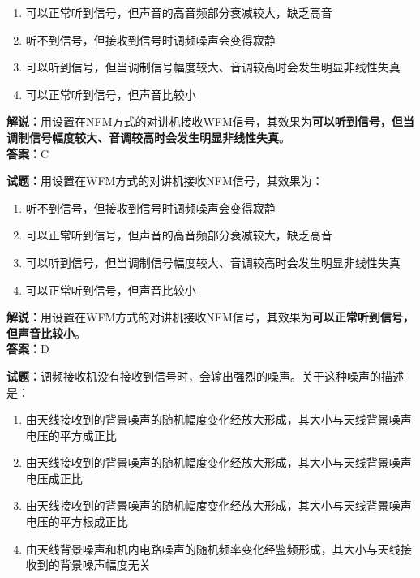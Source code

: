 \documentclass{ctexbook}
\begin{document}
\begin{enumerate}[leftmargin=3em]
  \item 可以正常听到信号，但声音的高音频部分衰减较大，缺乏高音
  \item 听不到信号，但接收到信号时调频噪声会变得寂静
  \item 可以听到信号，但当调制信号幅度较大、音调较高时会发生明显非线性失真
  \item 可以正常听到信号，但声音比较小
\end{enumerate}

\noindent\textbf{解说：}用设置在NFM方式的对讲机接收WFM信号，其效果为\textbf{可以听到信号，但当调制信号幅度较大、音调较高时会发生明显非线性失真}。\\\noindent\textbf{答案：}C

\bigskip

\noindent\textbf{试题：}用设置在WFM方式的对讲机接收NFM信号，其效果为：

\begin{enumerate}[leftmargin=3em]
  \item 听不到信号，但接收到信号时调频噪声会变得寂静
  \item 可以正常听到信号，但声音的高音频部分衰减较大，缺乏高音
  \item 可以听到信号，但当调制信号幅度较大、音调较高时会发生明显非线性失真
  \item 可以正常听到信号，但声音比较小
\end{enumerate}

\noindent\textbf{解说：}用设置在WFM方式的对讲机接收NFM信号，其效果为\textbf{可以正常听到信号，但声音比较小}。\\\noindent\textbf{答案：}D

\bigskip

\noindent\textbf{试题：}调频接收机没有接收到信号时，会输出强烈的噪声。关于这种噪声的描述是：

\begin{enumerate}[leftmargin=3em]
  \item 由天线接收到的背景噪声的随机幅度变化经放大形成，其大小与天线背景噪声电压的平方成正比
  \item 由天线接收到的背景噪声的随机幅度变化经放大形成，其大小与天线背景噪声电压成正比
  \item 由天线接收到的背景噪声的随机幅度变化经放大形成，其大小与天线背景噪声电压的平方根成正比
  \item 由天线背景噪声和机内电路噪声的随机频率变化经鉴频形成，其大小与天线接收到的背景噪声幅度无关
\end{enumerate}
\end{document}
